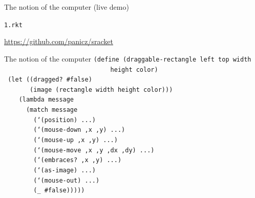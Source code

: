 \documentclass{beamer}
\begin{document}
{ %
  \begin{frame}[plain]
  \end{frame}
}

\begin{frame}{The notion of the computer (live demo)}
  \begin{center}
    \Huge
    \texttt{1.rkt}
  \end{center}
  \url{https://github.com/panicz/sracket}
\end{frame}

\begin{frame}{The notion of the computer}
  \small
  \texttt{(define (draggable-rectangle left top width \\
    \ \ \ \ \ \ \ \ \ \ \ \ \ \ \ \ \ \ \ \ \ \ \ \ \ \ \ \ \ height color)\\
    \ (let ((dragged? \#false)\\
  \ \ \ \ \ \ \ (image (rectangle width height color)))\\
  \ \ \ \ (lambda message\\
  \ \ \ \ \ \ (match message\\
  \ \ \ \ \ \ \ \ (`(position) ...)\\
  \ \ \ \ \ \ \ \ (`(mouse-down ,x ,y) ...)\\
  \ \ \ \ \ \ \ \ (`(mouse-up ,x ,y) ...)\\
  \ \ \ \ \ \ \ \ (`(mouse-move ,x ,y ,dx ,dy) ...)\\
  \ \ \ \ \ \ \ \ (`(embraces? ,x ,y) ...)\\
  \ \ \ \ \ \ \ \ (`(as-image) ...)\\
  \ \ \ \ \ \ \ \ (`(mouse-out) ...)\\
  \ \ \ \ \ \ \ \ (\_ \#false)))))\\
  \ \\
  \ \\
  \ \\
  \ 
}
\end{frame}
\end{document}
